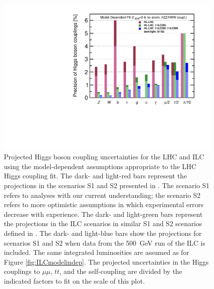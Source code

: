 \documentclass[%
reprint,
 floatfix,
 amsmath,amssymb,
 aps,
]{revtex4-1}
\begin{document}
\begin{figure}
\begin{center}
\includegraphics[width=0.99\hsize]{figures/ModeldepSummary.pdf}
\caption{Projected Higgs boson coupling uncertainties for the LHC and
  ILC
using the model-dependent assumptions appropriate to the LHC Higgs
coupling fit.   The
dark- and light-red bars represent the projections in the scenarios S1
and S2 presented in \cite{Yellow,CMSYellow}.  The scenario S1 refers to
analyses with our current understanding; the scenario S2 refers to
more optimistic assumptions in which experimental errors decrease with
experience.  The dark- and light-green bars represent the
projections in the ILC scenarios in similar S1 and S2 scenarios defined in \cite{ILCforESS}. 
 The dark- and light-blue bars show the projections for scenarios S1 and S2
when
data from the 500~GeV run of the ILC is included. The same integrated luminosities are assumed as for Figure \ref{fig:ILCmodelindep}. The projected uncertainties in the Higgs couplings to $\mu\mu$, $tt$, and the self-coupling are divided by the indicated factors to fit on the scale of this plot.}
 \label{fig:ILCLHC}
\end{center}
\vspace{-0.7cm}
\end{figure}
\end{document}
